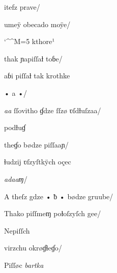 \splitverse

itefz prave/


\indentVerse umeÿ obecado moÿe/

	

\catcode `\^^M=5
\obeylines
kthore¹




\splitverse

thak ɲapiſſaƚ toɓe/	

\indentVerse  aɓi piſſaƚ tak krothke 


\splitverse

• a •/

\indentVerse  \textit{aa} ſſovitho ɠdze ſſzø ʋſdƚuſzaa/

\indentVerse  podƚuɠ 


\splitverse

theɠo bødze piſſaaɲ/

\indentVerse ɬudzij ʋſzyſtkÿch oçec 

\newpage

\splitverse

\textit{adaaɱ}/

\indentVerse A theſz gdze • ƀ • bødze gruube/ 



\splitverse

Thako piſſmeɱ poƚoſzyſch gee/

\newversesubline Nepiſſch 


\splitverse virzchu okrøɠɬeɠo/

\newversesubline Piſſøc \textit{bartka} \textit{}


